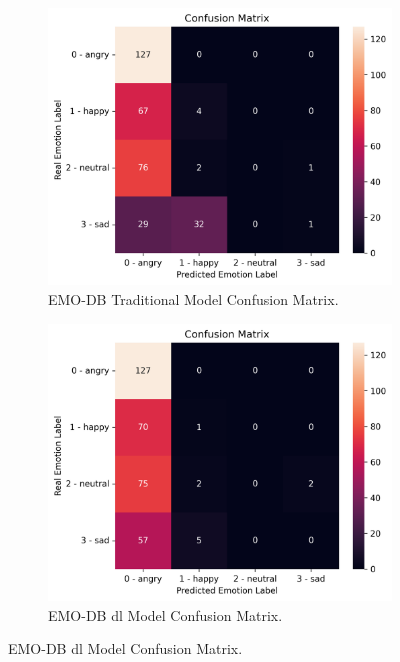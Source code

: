 \begin{figure}
	\newline
	\begin{subfigure}{.5\textwidth}
		\centering
		\includegraphics[width=\linewidth]{figs/4_5_discussion/emo_trad_cm.png}
		\caption{EMO-DB Traditional Model Confusion Matrix.}
	\end{subfigure}%
	\begin{subfigure}{.5\textwidth}
		\centering
		\includegraphics[width=\linewidth]{figs/4_5_discussion/emo_deep_cm.png}
		\caption{EMO-DB \ac{dl} Model Confusion Matrix.}
	\end{subfigure}
	\newline

\end{figure}
